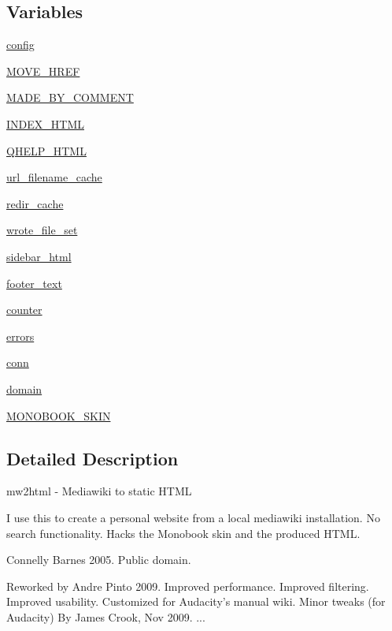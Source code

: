 \subsection*{Variables}
\begin{DoxyCompactItemize}
\item 
\hyperlink{namespacemw2html_a2313c67e4bb7b195ff9b5101bac8977b}{config}
\item 
\hyperlink{namespacemw2html_a3e4055cf6a1070956dccf42a6ed72682}{M\+O\+V\+E\+\_\+\+H\+R\+EF}
\item 
\hyperlink{namespacemw2html_af867388bb30ff9e3ab0a3cc2bf2159b5}{M\+A\+D\+E\+\_\+\+B\+Y\+\_\+\+C\+O\+M\+M\+E\+NT}
\item 
\hyperlink{namespacemw2html_a1172eca7f1e8a94d3f3e37d91d3bfa22}{I\+N\+D\+E\+X\+\_\+\+H\+T\+ML}
\item 
\hyperlink{namespacemw2html_a9751c2e63a93046633dc33af625ceb32}{Q\+H\+E\+L\+P\+\_\+\+H\+T\+ML}
\item 
\hyperlink{namespacemw2html_aad7750e105e67d26e3cb87d62d78cb0b}{url\+\_\+filename\+\_\+cache}
\item 
\hyperlink{namespacemw2html_ac19c25d8c5f0e9ce859a9358615724eb}{redir\+\_\+cache}
\item 
\hyperlink{namespacemw2html_ab2a6ee1e9196f93318d9e9819b0084e6}{wrote\+\_\+file\+\_\+set}
\item 
\hyperlink{namespacemw2html_ab1100d5e32fc3ee7258fe49d72805377}{sidebar\+\_\+html}
\item 
\hyperlink{namespacemw2html_a826a5658c74f288f0efba19ab6b5e9d5}{footer\+\_\+text}
\item 
\hyperlink{namespacemw2html_a1883350fdf7ae46dbc49d9efc4dace3b}{counter}
\item 
\hyperlink{namespacemw2html_a528858fd08982d70557f6c370383c876}{errors}
\item 
\hyperlink{namespacemw2html_a97cceba50a9da89b1bab3ff979d41a2b}{conn}
\item 
\hyperlink{namespacemw2html_a673cf42debbef44a18944c885b0e2f31}{domain}
\item 
\hyperlink{namespacemw2html_a0f008e4b1e0268f9ef3546e5a4cafc9b}{M\+O\+N\+O\+B\+O\+O\+K\+\_\+\+S\+K\+IN}
\end{DoxyCompactItemize}


\subsection{Detailed Description}
\begin{DoxyVerb}mw2html - Mediawiki to static HTML

I use this to create a personal website from a local mediawiki
installation.  No search functionality.  Hacks the Monobook skin and
the produced HTML.

Connelly Barnes 2005.  Public domain.

Reworked by Andre Pinto 2009.
Improved performance.
Improved filtering.
Improved usability.
Customized for Audacity's manual wiki.
Minor tweaks (for Audacity) By James Crook, Nov 2009.
...
\end{DoxyVerb}
 

